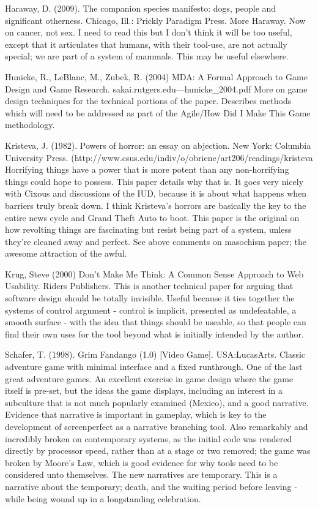 Haraway, D. (2009). The companion species manifesto: dogs, people and significant otherness. Chicago, 		Ill.: Prickly Paradigm Press.
	More Haraway. Now on cancer, not sex. I need to read this but I don't think it will be too useful, except that it articulates that humans, with their tool-use, are not actually special; we are part of a system of mammals. This may be useful elsewhere.

Hunicke, R., LeBlanc, M., Zubek, R. (2004) MDA: A Formal Approach to Game Design and Game Research. sakai.rutgers.edu—hunicke_2004.pdf
	More on game design techniques for the technical portions of the paper. Describes methods which will need to be addressed as part of the Agile/How Did I Make This Game methodology.

Kristeva, J. (1982). Powers of horror: an essay on abjection. New York: Columbia University Press. (http://www.csus.edu/indiv/o/obriene/art206/readings/kristeva%
	Horrifying things have a power that is more potent than any non-horrifying things could hope to possess. This paper details why that is. It goes very nicely with Cixous and discussions of the IUD, because it is about what happens when barriers truly break down. I think Kristeva's horrors are basically the key to the entire news cycle and Grand Theft Auto to boot. This paper is the original on how revolting things are fascinating but resist being part of a system, unless they're cleaned away and perfect. See above comments on masochism paper; the awesome attraction of the awful.


Krug, Steve (2000) Don't Make Me Think: A Common Sense Approach to Web Usability.
	Riders Publishers.
	This is another technical paper for arguing that software design should be totally invisible. Useful because it ties together the systems of control argument - control is implicit, presented as undefeatable, a smooth surface - with the idea that things should be useable, so that people can find their own uses for the tool beyond what is initially intended by the author.

Schafer, T. (1998). Grim Fandango (1.0) [Video Game]. USA:LucasArts.
	Classic adventure game with minimal interface and a fixed runthrough. One of the last great adventure games. An excellent exercise in game design where the game itself is pre-set, but the ideas the game displays, including an interest in a subculture that is not much popularly examined (Mexico), and a good narrative. Evidence that narrative is important in gameplay, which is key to the development of screenperfect as a narrative branching tool. Also remarkably and incredibly broken on contemporary systems, as the initial code was rendered directly by processor speed, rather than at a stage or two removed; the game was broken by Moore's Law, which is good evidence for why tools need to be considered unto themselves. The new narratives are temporary. This is a narrative about the temporary; death, and the waiting period before leaving - while being wound up in a longstanding celebration.


